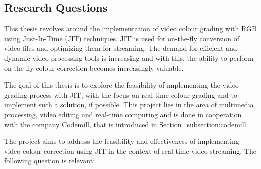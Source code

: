\documentclass[../MasterThesis.tex]{subfiles}
\begin{document}
	
	
	
	
	
	
	
	
	
	
	
	
	
	
	
	\subsection{Research Questions} \label{subsection:research%
		TODOquestions}
	
	
	This thesis revolves around the implementation of video colour grading with RGB using Just-In-Time (JIT) techniques. 	
	JIT is used for on-the-fly conversion of video files and optimizing them for streaming. 
	The demand for efficient and dynamic video processing tools is increasing and with this, the ability to perform on-the-fly colour correction becomes increasingly valuable. 
	
	
	The goal of this thesis is to explore the feasibility of implementing the video grading process with JIT, with the focus on real-time colour grading and to implement such a solution, if possible. This project lies in the area of multimedia processing, video editing and real-time computing and is done in cooperation with the company Codemill, that is introduced in Section~\ref{subsection:codemill}.
	
	
	
	The project aims to address the feasibility and effectiveness of implementing video colour correction using JIT in the context of real-time video streaming. The following question is relevant:
	
\end{document}
